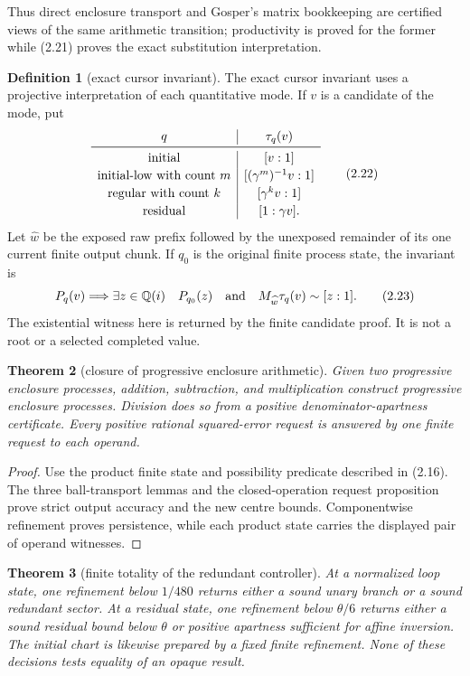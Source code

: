 \documentclass[10pt]{article}
\newtheorem{theorem}{Theorem}[section]
\theoremstyle{definition}
\newtheorem{definition}[theorem]{Definition}
\theoremstyle{remark}
\newcommand{\Qi}{\mathbb{Q}(i)}
\newcommand{\Proj}[2]{[#1:#2]}
\begin{document}
Thus direct enclosure transport and Gosper's matrix bookkeeping are certified
views of the same arithmetic transition; productivity is proved for the
former while (2.21) proves the exact substitution interpretation.

\begin{definition}[exact cursor invariant]
The exact cursor invariant uses a projective interpretation of each
quantitative mode.  If $v$ is a candidate of the mode, put
\[
\begin{array}{c|c}
q&\tau_q(v)\\ \midrule
\text{initial}&\Proj{v}{1}\\[2pt]
\text{initial-low with count }m&\Proj{(\gamma^m)^{-1}v}{1}\\[2pt]
\text{regular with count }k&\Proj{\gamma^k v}{1}\\[2pt]
\text{residual}&\Proj{1}{\gamma v}.
\end{array}
\tag{2.22}
\]
Let $\widehat w$ be the exposed raw prefix followed by the unexposed
remainder of its one current finite output chunk.  If $q_0$ is the original
finite process state, the invariant is
\[
 P_q(v)\Longrightarrow
 \exists z\in\Qi\quad
 P_{q_0}(z)\quad\hbox{and}\quad
 M_{\widehat w}\tau_q(v)\sim\Proj{z}{1}.
\tag{2.23}
\]
The existential witness here is returned by the finite candidate proof.  It
is not a root or a selected completed value.
\end{definition}

\begin{theorem}[closure of progressive enclosure arithmetic]
Given two progressive enclosure processes, addition, subtraction, and
multiplication construct progressive enclosure processes.  Division does so
from a positive denominator-apartness certificate.  Every positive rational
squared-error request is answered by one finite request to each operand.
\end{theorem}

\begin{proof}
Use the product finite state and possibility predicate described in (2.16).
The three ball-transport lemmas and the closed-operation request proposition
prove strict output accuracy and the new centre bounds.  Componentwise refinement proves
persistence, while each product state carries the displayed pair of operand
witnesses.
\end{proof}

\begin{theorem}[finite totality of the redundant controller]
At a normalized loop state, one refinement below $1/480$ returns either a
sound unary branch or a sound redundant sector.  At a residual state, one
refinement below $\theta/6$ returns either a sound residual bound below
$\theta$ or positive apartness sufficient for affine inversion.  The initial
chart is likewise prepared by a fixed finite refinement.  None of these
decisions tests equality of an opaque result.
\end{theorem}
\end{document}
